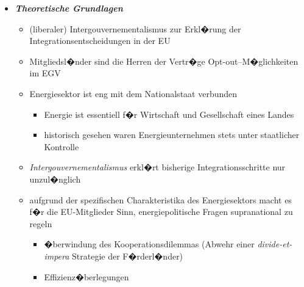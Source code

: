 \documentclass[9pt,a4paper,ngerman]{report}
\begin{document}
 		\begin{itemize}
 			
 			\item{\textcolor{midblue}{\textbf{\textsl{Theoretische Grundlagen}}}}
 				
 				\begin{itemize}
 					
 					\item{(liberaler) Intergouvernementalismus zur Erkl�rung der 
 								Integrationsentscheidungen in der EU}
 					\item{Mitgliedsl�nder sind die Herren der Vertr�ge
 								\texttwelveudash {} Opt-out--M�glichkeiten im EGV}
 					\item{Energiesektor ist eng mit dem Nationalstaat verbunden}
 						
 						\begin{itemize}
 							
 							\item{\textcolor{dunkelgrau.60}{Energie ist essentiell 
 											f�r	Wirtschaft und Gesellschaft eines Landes}}
 							\item{\textcolor{dunkelgrau.60}{historisch gesehen waren 
 										Energieunternehmen stets unter staatlicher 
 										Kontrolle}}
 										
 						\end{itemize}
 	
 	
 	\reversemarginpar
 						
 					\item{\textsl{Intergouvernementalismus} erkl�rt bisherige
 								Integrationsschritte nur unzul�nglich}
 					\item{aufgrund der spezifischen Charakteristika des 
 								Energiesektors 
 								 macht es f�r die EU-Mitglieder Sinn, 
 								energiepolitische Fragen supranational zu regeln}
 	
 	\normalmarginpar
 							
 							\begin{itemize}
 							
 								\item{\textcolor{dunkelgrau.60}{�berwindung des 
 											Kooperationsdilemmas (Abwehr einer 	
 											\textsl{divide-et-impera} \texttwelveudash {}  
 															Strategie der F�rderl�nder)}}
 											
 								\item{\textcolor{dunkelgrau.60}{Effizienz�berlegungen}}
 								

\end{itemize}
\end{itemize}
\end{itemize}
\end{document}
